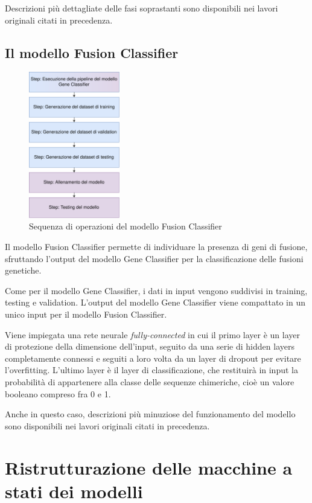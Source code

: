 Descrizioni più dettagliate delle fasi soprastanti sono disponibili nei lavori originali citati in precedenza.

\subsection{Il modello Fusion Classifier}
\begin{figure}[h]
    \centering
    \includegraphics[width=150px]{figures/ch2/fusion_stati.png}
    \caption[Sequenza di operazioni del modello Fusion Classifier]{Sequenza di operazioni del modello Fusion Classifier}
    \label{fig:cha2:fusion_stati}
\end{figure}

Il modello Fusion Classifier permette di individuare la presenza di geni di fusione, sfruttando l'output del modello Gene Classifier per la classificazione delle fusioni genetiche.

Come per il modello Gene Classifier, i dati in input vengono suddivisi in training, testing e validation. L'output del modello Gene Classifier viene compattato in un unico input per il modello Fusion Classifier.

Viene impiegata una rete neurale {\em fully-connected} in cui il primo layer è un layer di protezione della dimensione dell'input, seguito da una serie di hidden layers completamente connessi e seguiti a loro volta da un layer di dropout per evitare l'overfitting. L'ultimo layer è il layer di classificazione, che restituirà in input la probabilità di appartenere alla classe delle sequenze chimeriche, cioè un valore booleano compreso fra 0 e 1.

Anche in questo caso, descrizioni più minuziose del funzionamento del modello sono disponibili nei lavori originali citati in precedenza.

\section{Ristrutturazione delle macchine a stati dei modelli}

